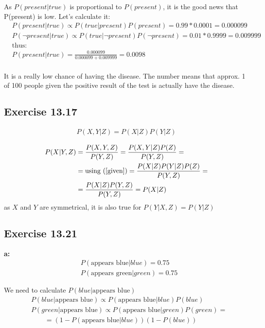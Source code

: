 \documentclass[12pt, a4paper]{article}
\begin{document}
            As $P(present|true)$ is proportional to $P(present)$, it is the good news that P(present) is low. Let's calculate it:
            \begin{align*}
                &P(present|true) \propto P(true|present) P(present) = 0.99 * 0.0001 = 0.000099\\
                &P(\neg present|true) \propto P(true|\neg present) P(\neg present) = 0.01 * 0.9999 = 0.009999\\
                &\text{thus:}\\
                &P(present|true) = \frac{0.000099}{0.000099 + 0.009999} = 0.0098\\
            \end{align*}

            It is a really low chance of having the disease. The number means that approx. 1 of 100 people given the positive result of the test is actually have the disease.

        \subsection{Exercise 13.17}
            \begin{align}
                \label{given}
                P(X, Y | Z) = P(X|Z)P(Y|Z)
            \end{align}

            \begin{align*}
                P(X|Y,Z) &= \frac{P(X,Y,Z)}{P(Y, Z)} = \frac{P(X,Y|Z)P(Z)}{P(Y,Z)} =\\
                &= \text{using (\ref{given})} = \frac{P(X|Z)P(Y|Z)P(Z)}{P(Y,Z)} =\\
                &= \frac{P(X|Z)P(Y,Z)}{P(Y,Z)} = P(X|Z)\\
            \end{align*}
            as $X$ and $Y$ are symmetrical, it is also true for $P(Y|X,Z) = P(Y|Z)$

        \subsection{Exercise 13.21}
            \textbf{a:}
            \begin{align*}
                &P(\text{appears blue}|blue) = 0.75\\
                &P(\text{appears green}|green) = 0.75
            \end{align*}

            We need to calculate $P(blue|\text{appears blue})$
            \begin{align*}
                &P(blue|\text{appears blue}) \propto P(\text{appears blue}|blue) P(blue)\\
                &P(green|\text{appears blue}) \propto P(\text{appears blue}|green) P(green) =\\
                & \qquad = (1 - P(\text{appears blue}|blue)) (1 - P(blue))
            \end{align*}
\end{document}
